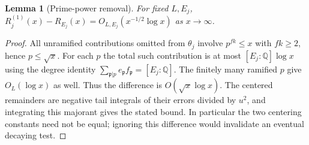 \documentclass[11pt]{article}
\newtheorem{lemma}[theorem]{Lemma}
\theoremstyle{remark}\newtheorem{remark}[theorem]{Remark}
\newcommand{\Q}{\mathbb Q}
\begin{document}
\begin{lemma}[Prime-power removal]\label{lem:primepower}
For fixed $L,E_j$, $R_j^{(1)}(x)-R_{E_j}(x)=O_{L,E_j}(x^{-1/2}\log x)$ as $x\to\infty$.
\end{lemma}
\begin{proof}
All unramified contributions omitted from $\theta_j$ involve $p^{fk}\le x$ with $fk\ge2$, hence $p\le\sqrt{x}$. For each $p$ the total such contribution is at most $[E_j:\Q]\log x$ using the degree identity $\sum_{\mathfrak p|p}e_{\mathfrak p}f_{\mathfrak p}=[E_j:\Q]$. The finitely many ramified $p$ give $O_L(\log x)$ as well. Thus the difference is $O(\sqrt{x}\log x)$. The centered remainders are negative tail integrals of their errors divided by $u^2$, and integrating this majorant gives the stated bound. In particular the two centering constants need not be equal; ignoring this difference would invalidate an eventual decaying test.
\end{proof}
\end{document}
